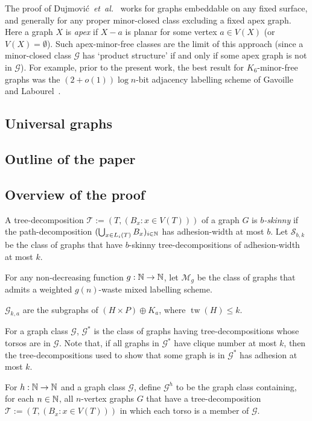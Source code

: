 \documentclass{patmorin}
\renewcommand{\le}{\leqslant}
\newcommand{\defin}[1]{\emph{\textcolor{brightmaroon}{#1}}}
\DeclareMathOperator{\tw}{tw}
\begin{document}
The proof of Dujmovi\'c~\emph{et~al.}~\cite{dujmovic.esperet.ea:adjacency} works for  graphs embeddable on any fixed surface, and generally for any proper minor-closed class excluding a fixed apex graph. Here a graph $X$ is \defin{apex} if $X-a$ is planar for some vertex $a\in V(X)$ (or $V(X)=\emptyset$). Such apex-minor-free classes are the limit of this approach (since a minor-closed class $\mathcal{G}$ has `product structure' if and only if some apex graph is not in $\mathcal{G}$). For example, prior to the present work, the best result for $K_6$-minor-free graphs was the $(2+o(1))\log n$-bit adjacency labelling scheme of Gavoille and Labourel~\cite{gavoille.labourel:shorter}.



\subsection{Universal graphs}
\label{ssec:universal-graphs}
\subsection{Outline of the paper}
\label{ssec:outline}
\subsection{Overview of the proof}
\label{ssec:overview}

A tree-decomposition $\mathcal{T}:=(T,(B_x:x\in V(T)))$ of a graph $G$ is \defin{$b$-skinny} if the path-decomposition $(\bigcup_{x\in L_i(T)} B_x)_{i\in\mathbb{N}}$ has adhesion-width at most $b$.  Let $\mathcal{S}_{b,k}$ be the class of graphs that have $b$-skinny tree-decompositions of adhesion-width at most $k$.

For any non-decreasing function $g:\mathbb{N}\to\mathbb{N}$, let \defin{$\mathcal{M}_g$} be the class of graphs that admits a weighted $g(n)$-waste mixed labelling scheme.

$\mathcal{G}_{k,a}$ are the subgraphs of $(H\times P) \oplus K_a$, where $\tw(H)\le k$.

For a graph class $\mathcal{G}$, \defin{$\mathcal{G}^*$} is the class of graphs having tree-decompositions whose torsos are in $\mathcal{G}$.  Note that, if all graphs in $\mathcal{G}^*$ have clique number at most $k$, then the tree-decompositions used to show that some graph is in $\mathcal{G}^*$ has adhesion at most $k$.

For $h:\mathbb{N}\to\mathbb{N}$ and a graph class $\mathcal{G}$, define $\mathcal{G}^h$ to be the graph class containing, for each $n\in\mathbb{N}$, all $n$-vertex graphs $G$ that have a tree-decomposition $\mathcal{T}:=(T,(B_x:x\in V(T)))$ in which each torso is a member of $\mathcal{G}$.
\end{document}
